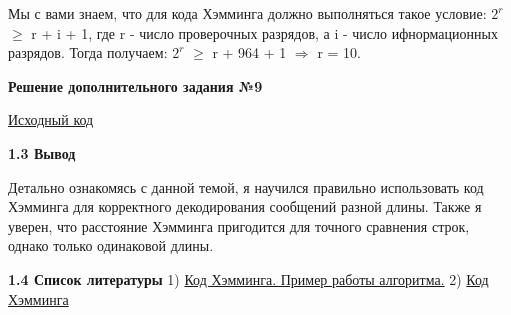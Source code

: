 \begin{flushleft}
		\small Мы с вами знаем, что для кода Хэмминга должно выполняться такое условие:
		\linebreak
		\small $2^r$ $\geq$ r + i + 1, где r - число проверочных разрядов, а i - число ифнормационных разрядов.
		\linebreak
		\small Тогда получаем: $2^r$ $\geq$ r + 964 + 1 $\Rightarrow$ r = 10.
		\linebreak
		\vspace*{10mm}
		
		\textbf{Решение дополнительного задания №9}
		\linebreak
		\vspace*{5mm}
			
		\href{https://github.com/mysticslippers/Lab2_INF}{Исходный код}
	\end{flushleft}

	\newpage
	\begin{flushleft}
		\LARGE \textbf{1.3 Вывод}
		\linebreak
		\vspace*{10mm}
		
		\small Детально ознакомясь с данной темой, я научился правильно использовать код Хэмминга для корректного декодирования сообщений разной длины. Также я уверен, что расстояние Хэмминга пригодится для точного сравнения строк, однако только одинаковой длины.
		\linebreak
	\end{flushleft}

	\newpage
	\begin{flushleft}
		\LARGE \textbf{1.4 Список литературы}
		\linebreak
		\small 1) \href{https://habr.com/ru/post/140611/}{Код Хэмминга. Пример работы алгоритма.}
		\linebreak
		\small 2) \href{http://www.mephist.ru/mephist/material.nsf/0/57578c33b21b592143257e3d006970e3/$file/%D0%9A%D0%BE%D0%B4+%D0%A5%D1%8D%D0%BC%D0%BC%D0%B8%D0%BD%D0%B3%D0%B0.pdf}{Код Хэмминга}
	\end{flushleft}
